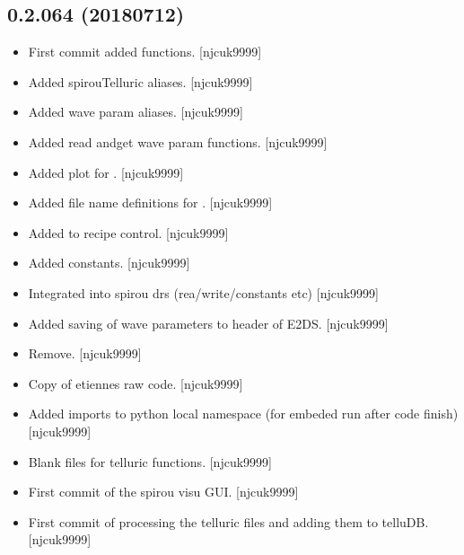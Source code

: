 \documentclass[a4paper,10pt,english]{report}
\begin{document}
\subsection{0.2.064 (2018\sphinxhyphen{}07\sphinxhyphen{}12)}
\label{\detokenize{misc/changelog:id415}}\begin{itemize}
\item {} 
First commit \sphinxhyphen{} added  functions. {[}njcuk9999{]}

\item {} 
Added spirouTelluric aliases. {[}njcuk9999{]}

\item {} 
Added wave param aliases. {[}njcuk9999{]}

\item {} 
Added read andget wave param functions. {[}njcuk9999{]}

\item {} 
Added plot for . {[}njcuk9999{]}

\item {} 
Added file name definitions for . {[}njcuk9999{]}

\item {} 
Added  to recipe control. {[}njcuk9999{]}

\item {} 
Added  constants. {[}njcuk9999{]}

\item {} 
Integrated  into spirou drs (rea/write/constants etc)
{[}njcuk9999{]}

\item {} 
Added saving of wave parameters to header of E2DS. {[}njcuk9999{]}

\item {} 
Remove. {[}njcuk9999{]}

\item {} 
Copy of etiennes raw  code. {[}njcuk9999{]}

\item {} 
Added imports to python local namespace (for embeded run after code
finish) {[}njcuk9999{]}

\item {} 
Blank files for telluric functions. {[}njcuk9999{]}

\item {} 
First commit of the spirou visu GUI. {[}njcuk9999{]}

\item {} 
First commit of  \sphinxhyphen{} processing the telluric files and
adding them to telluDB. {[}njcuk9999{]}

\end{itemize}
\end{document}
